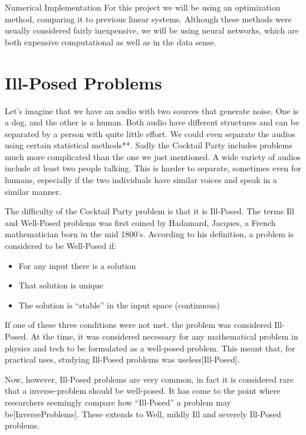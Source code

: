 \documentclass{book}
\begin{document}
Numerical Implementation
    For this project we will be using an optimization method, comparing it to previous linear systems.
    Although these methods were usually considered fairly inexpensive, we will be using neural networks, which are both expensive computational as well as in the data sense. 


\section{Ill-Posed Problems}
\qquad Let's imagine that we have an audio with two sources that generate noise.
One is a dog, and the other is a human.
Both audio have different structures and can be separated by a person with quite little effort.
We could even separate the audios using certain statistical methods**.
Sadly the Cocktail Party includes problems much more complicated than the one we just mentioned.
A wide variety of audios include at least two people talking.
This is harder to separate, sometimes even for humans, especially if the two individuals have similar voices and speak in a similar manner.
\par
    The difficulty of the Cocktail Party problem is that it is Ill-Posed.
    The terms Ill and Well-Posed problems was first coined by Hadamard, Jacques, a French mathematician born in the mid 1800’s.
    According to his definition, a problem is considered to be Well-Posed if: 
\begin{itemize}
    \item For any input there is a solution
    \item That solution is unique
    \item The solution is “stable” in the input space (continuous)
\end{itemize}
If one of these three conditions were not met, the problem was considered Ill-Posed.
At the time, it was considered necessary for any mathematical problem in physics and tech to be formulated as a well-posed problem.
This meant that, for practical uses, studying Ill-Posed problems was useless[Ill-Posed].

Now, however, Ill-Posed problems are very common, in fact it is considered rare that a inverse-problem should be well-posed.
It has come to the point where researchers seemingly compare how “Ill-Posed” a problem may be[InverseProblems].
These extends to Well, mildly Ill and severely Ill-Posed problems.
\end{document}

